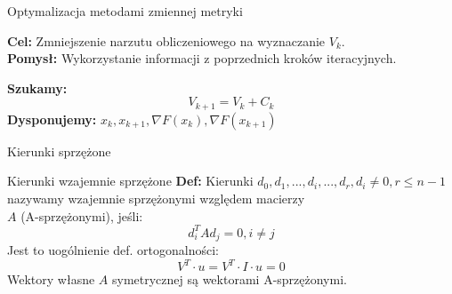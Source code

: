   \begin{frame}{Optymalizacja metodami zmiennej metryki}
    \begin{block}{}
      \textbf{Cel: } Zmniejszenie narzutu obliczeniowego na wyznaczanie $V_k$.\\
      \textbf{Pomysł: } Wykorzystanie informacji z poprzednich kroków iteracyjnych.
    \end{block}

    \begin{block}{}
      \textbf{Szukamy: }
        \begin{equation}
          V_{k + 1} = V_k + C_k
        \end{equation}
      \textbf{Dysponujemy: } $x_k, x_{k + 1}, \nabla F(x_k), \nabla F(x_{k + 1})$
    \end{block}
  \end{frame}

  \begin{frame}{Kierunki sprzężone}
    \begin{block}{Kierunki wzajemnie sprzężone}
      \textbf{Def: } Kierunki $d_0, d_1, ..., d_i, ..., d_r, d_i \neq 0, r \leq n - 1$\\
      nazywamy wzajemnie sprzężonymi względem macierzy\\
      $A$ (A-sprzężonymi), jeśli:
      \begin{equation*}
        d_i^T A d_j = 0, i \neq j
      \end{equation*}
      Jest to uogólnienie def. ortogonalności:
      \begin{equation*}
        V^T \cdot u = V^T \cdot I \cdot u = 0
      \end{equation*}
      Wektory własne $A$ symetrycznej są wektorami A-sprzężonymi.
    \end{block}
  \end{frame}

